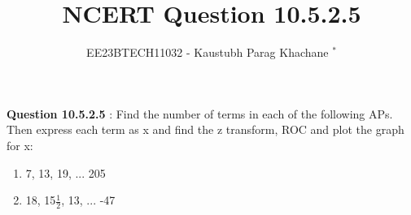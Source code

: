 \documentclass[journal,12pt,twocolumn]{IEEEtran}
\theoremstyle{remark}
\begin{document}

\vspace{3cm}

\Large\title{NCERT Question 10.5.2.5}
\large\author{EE23BTECH11032 - Kaustubh Parag Khachane $^{*}$%
}
\maketitle
\newpage
\bigskip

\renewcommand{\thefigure}{\theenumi}
\renewcommand{\thetable}{\theenumi}
\large\textbf{Question 10.5.2.5} : \normalsize Find the number of terms in each of the following APs. Then express each term as x and find the z transform, ROC and plot the graph for x: 
\begin{enumerate}
    \item 7, 13, 19, ... 205

    \item 18, 15$\frac{1}{2}$, 13, ... -47
\end{enumerate}
\end{document}
